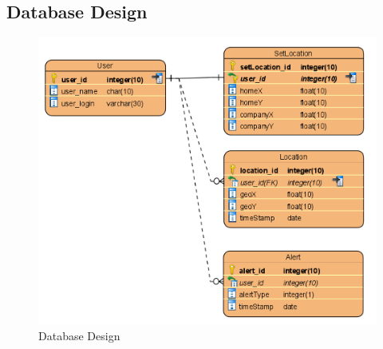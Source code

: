 \documentclass[conference]{IEEEtran}
\begin{document}
\subsection{Database Design}
\begin{figure}[htbp]
    \centering
    \includegraphics{images/figure6.png}
    \caption{Database Design}
\end{figure}
\end{document}
